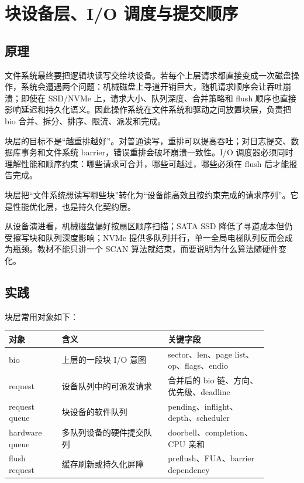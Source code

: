 \chapter{块设备层、I/O 调度与提交顺序}

\section{原理}

文件系统最终要把逻辑块读写交给块设备。若每个上层请求都直接变成一次磁盘操作，系统会遭遇两个问题：机械磁盘上寻道开销巨大，随机请求顺序会让吞吐崩溃；即使在 SSD/NVMe 上，请求大小、队列深度、合并策略和 flush 顺序也直接影响延迟和持久化语义。因此操作系统在文件系统和驱动之间放置块层，负责把 bio 合并、拆分、排序、限流、派发和完成。

块层的目标不是“越重排越好”。对普通读写，重排可以提高吞吐；对日志提交、数据库事务和文件系统 barrier，错误重排会破坏崩溃一致性。I/O 调度器必须同时理解性能和顺序约束：哪些请求可合并，哪些可越过，哪些必须在 flush 后才能报告完成。

\begin{keyidea}
块层把“文件系统想读写哪些块”转化为“设备能高效且按约束完成的请求序列”。它是性能优化层，也是持久化契约层。
\end{keyidea}

从设备演进看，机械磁盘偏好按扇区顺序扫描；SATA SSD 降低了寻道成本但仍受擦写块和队列深度影响；NVMe 提供多队列并行，单一全局电梯队列反而会成为瓶颈。教材不能只讲一个 SCAN 算法就结束，而要说明为什么算法随硬件变化。

\section{实践}

块层常用对象如下：

\begin{longtable}{|p{0.18\linewidth}|p{0.36\linewidth}|p{0.34\linewidth}|}
\toprule
对象 & 含义 & 关键字段 \\
\midrule
bio & 上层的一段块 I/O 意图 & sector、len、page list、op、flags、endio \\\tablerowrule
request & 设备队列中的可派发请求 & 合并后的 bio 链、方向、优先级、deadline \\\tablerowrule
request queue & 块设备的软件队列 & pending、inflight、depth、scheduler \\\tablerowrule
hardware queue & 多队列设备的硬件提交队列 & doorbell、completion、CPU 亲和 \\\tablerowrule
flush request & 缓存刷新或持久化屏障 & preflush、FUA、barrier dependency \\
\bottomrule
\end{longtable}

